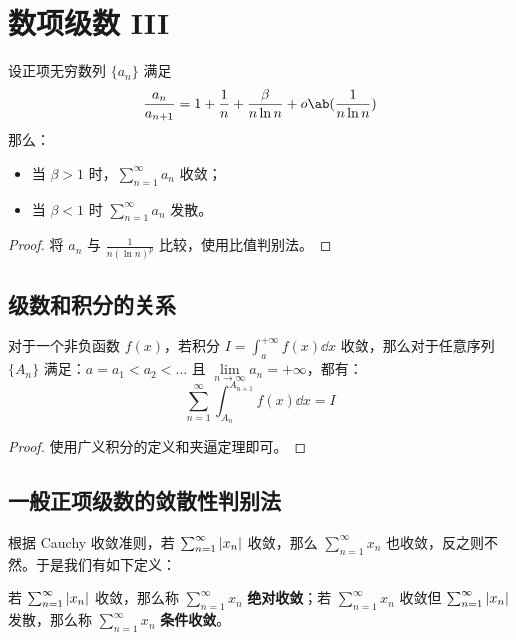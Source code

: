 \section{数项级数 III}

\begin{theorem}
    设正项无穷数列 $\{a_n\}$ 满足
    $$
    \frac{a_n}{a_{n + 1}} = 1 + \frac{1}{n} + \frac{\beta}{n \ln n} + o\ab(\frac{1}{n \ln n})
    $$
    那么：
    \begin{itemize}
        \item 当 $\beta > 1$ 时，$\sum\limits_{n = 1}^{\infty} a_n$ 收敛；
        \item 当 $\beta < 1$ 时 $\sum\limits_{n = 1}^{\infty} a_n$ 发散。
    \end{itemize}

    \begin{proof}
        将 $a_n$ 与 $\frac{1}{n (\ln n)^{p}}$ 比较，使用比值判别法。
    \end{proof}
\end{theorem}

\subsection{级数和积分的关系}

\begin{theorem}
    对于一个非负函数 $f(x)$，若积分 $\displaystyle I = \int_a^{+ \infty} f(x) \dd{x}$ 收敛，那么对于任意序列 $\{A_n\}$ 满足：$a = a_1 < a_2 < \dots$ 且 $\lim\limits_{n \to \infty} a_n = +\infty$，都有：
    $$
    \sum_{n = 1}^{\infty} \int_{A_n}^{A_{n + 1}} f(x) \dd{x} = I
    $$

    \begin{proof}
        使用广义积分的定义和夹逼定理即可。
    \end{proof}
\end{theorem}

\subsection{一般正项级数的敛散性判别法}

根据 Cauchy 收敛准则，若 $\sum_{n = 1}^{\infty} \abs{x_n}$ 收敛，那么 $\sum_{n = 1}^{\infty} x_n$ 也收敛，反之则不然。于是我们有如下定义：

\begin{definition}[绝对收敛和条件收敛]
    若 $\sum_{n = 1}^{\infty} \abs{x_n}$ 收敛，那么称 $\sum_{n = 1}^{\infty} x_n$ \textbf{绝对收敛}；若 $\sum_{n = 1}^{\infty} x_n$ 收敛但 $\sum_{n = 1}^{\infty} \abs{x_n}$ 发散，那么称 $\sum_{n = 1}^{\infty} x_n$ \textbf{条件收敛}。
\end{definition}

